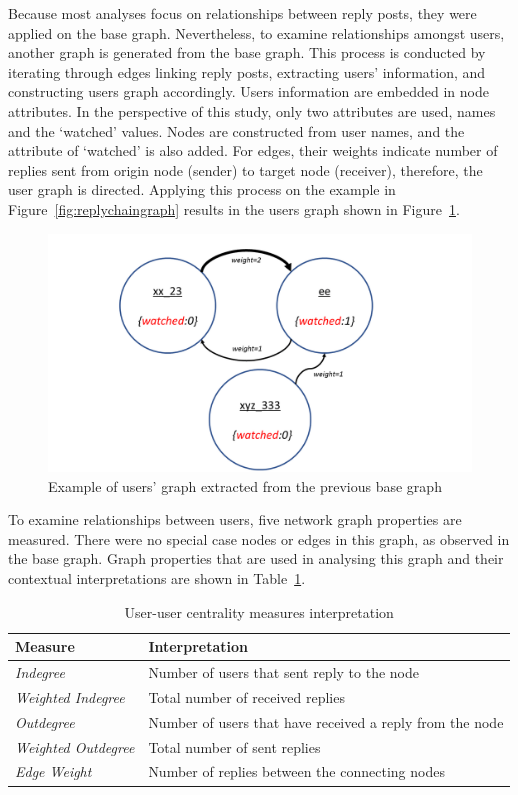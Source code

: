 \documentclass[sigconf]{acmart}
\begin{document}
Because most analyses focus on relationships between reply posts, they
were applied on the base graph. Nevertheless, to examine relationships
amongst users, another graph is generated from the base graph. This
process is conducted by iterating through edges linking reply posts,
extracting users' information, and constructing users graph
accordingly. Users information are embedded in node attributes. In the
perspective of this study, only two attributes are used, names and the
`watched' values. Nodes are constructed from user names, and the
attribute of `watched' is also added. For edges, their weights
indicate number of replies sent from origin node (sender) to target
node (receiver), therefore, the user graph is directed. Applying this
process on the example in Figure~\ref{fig:replychaingraph} results in
the users graph shown in Figure~\ref{fig:usersgraph}.

\begin{figure}[htb]
\centering
\includegraphics[width=\columnwidth]{images/usersgraph.png}
\caption{Example of users' graph extracted from the previous base graph}
\label{fig:usersgraph}
\end{figure}

To examine relationships between users, five network graph properties
are measured. There were no special case nodes or edges in this graph,
as observed in the base graph. Graph properties that are used in
analysing this graph and their contextual interpretations are shown in
Table~\ref{tbl:uucentralitymeasuresinter}.

\begin{table}[!h]
\centering
\begin{tabularx}{\columnwidth}{lX}
\toprule
\textbf{Measure} & \textbf{Interpretation} \\ 
\midrule
{\emph{Indegree}} & Number of users that sent reply to the node \\
{\emph{Weighted Indegree}} & Total number of received replies \\
{\emph{Outdegree}} & Number of users that have received a reply from
                     the node \\ 
{\emph{Weighted Outdegree}} & Total number of sent replies \\
{\emph{Edge Weight}}& Number of replies between the connecting nodes\\
\bottomrule
\end{tabularx}
\caption{User-user centrality measures interpretation}
\label{tbl:uucentralitymeasuresinter}
\end{table}
\end{document}
